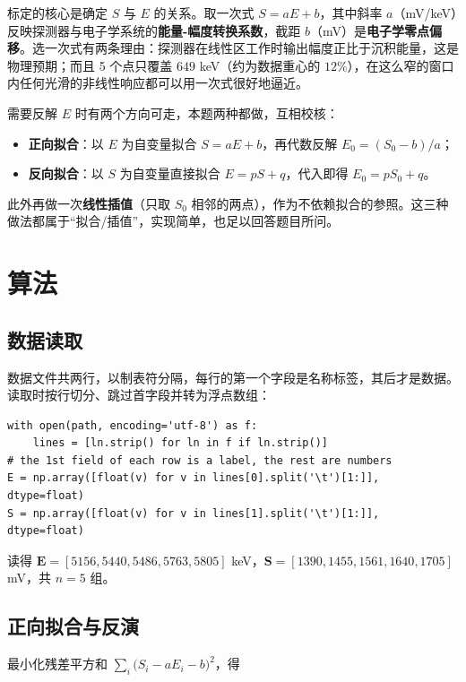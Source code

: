 \documentclass[UTF8,a4paper,12pt]{ctexart}
\begin{document}
标定的核心是确定 $S$ 与 $E$ 的关系。取一次式 $S=aE+b$，其中斜率 $a$（mV/keV）反映探测器与电子学系统的\textbf{能量-幅度转换系数}，截距 $b$（mV）是\textbf{电子学零点偏移}。选一次式有两条理由：探测器在线性区工作时输出幅度正比于沉积能量，这是物理预期；而且 5 个点只覆盖 $649$ keV（约为数据重心的 $12\%$），在这么窄的窗口内任何光滑的非线性响应都可以用一次式很好地逼近。

需要反解 $E$ 时有两个方向可走，本题两种都做，互相校核：

\begin{itemize}
  \item \textbf{正向拟合}：以 $E$ 为自变量拟合 $S=aE+b$，再代数反解 $E_0=(S_0-b)/a$；
  \item \textbf{反向拟合}：以 $S$ 为自变量直接拟合 $E=pS+q$，代入即得 $E_0=pS_0+q$。
\end{itemize}

此外再做一次\textbf{线性插值}（只取 $S_0$ 相邻的两点），作为不依赖拟合的参照。这三种做法都属于“拟合/插值”，实现简单，也足以回答题目所问。

\section{算法}

\subsection{数据读取}

数据文件共两行，以制表符分隔，每行的第一个字段是名称标签，其后才是数据。读取时按行切分、跳过首字段并转为浮点数组：

\begin{lstlisting}
with open(path, encoding='utf-8') as f:
    lines = [ln.strip() for ln in f if ln.strip()]
# the 1st field of each row is a label, the rest are numbers
E = np.array([float(v) for v in lines[0].split('\t')[1:]], dtype=float)
S = np.array([float(v) for v in lines[1].split('\t')[1:]], dtype=float)
\end{lstlisting}

读得 $\mathbf{E}=[5156,5440,5486,5763,5805]$ keV，$\mathbf{S}=[1390,1455,1561,1640,1705]$ mV，共 $n=5$ 组。

\subsection{正向拟合与反演}

最小化残差平方和 $\sum_i\big(S_i-aE_i-b\big)^2$，得
\end{document}
